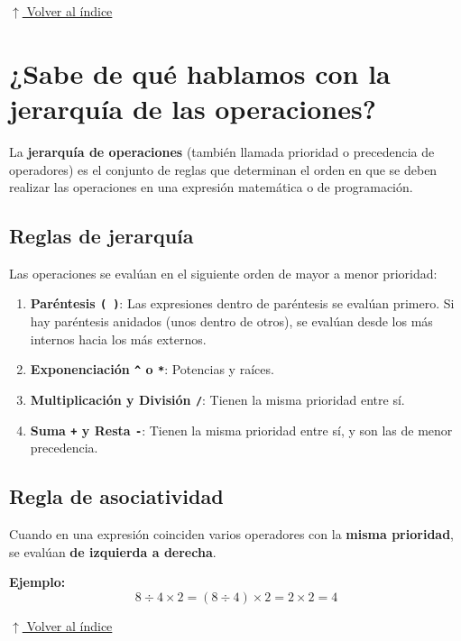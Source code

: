 \documentclass[12pt]{article}
\newcommand{\codigo}[1]{\texttt{\small #1}}
\newcommand{\volverindice}{%
    \vspace{1em}%
    \begin{flushright}%
        \hyperlink{indice}{\small $\uparrow$ Volver al índice}%
    \end{flushright}%
}
\begin{document}
\volverindice
\newpage


\section{¿Sabe de qué hablamos con la jerarquía de las operaciones?}

La \textbf{jerarquía de operaciones} (también llamada prioridad o precedencia de operadores) es el conjunto de reglas que determinan el orden en que se deben realizar las operaciones en una expresión matemática o de programación.

\subsection{Reglas de jerarquía}

Las operaciones se evalúan en el siguiente orden de mayor a menor prioridad:

\begin{enumerate}
    \item \textbf{Paréntesis \codigo{( )}}: Las expresiones dentro de paréntesis se evalúan primero. Si hay paréntesis anidados (unos dentro de otros), se evalúan desde los más internos hacia los más externos.
    
    \item \textbf{Exponenciación \codigo{\^{}} o \codigo{**}}: Potencias y raíces.
    
    \item \textbf{Multiplicación \codigo{*} y División \codigo{/}}: Tienen la misma prioridad entre sí.
    
    \item \textbf{Suma \codigo{+} y Resta \codigo{-}}: Tienen la misma prioridad entre sí, y son las de menor precedencia.
\end{enumerate}

\subsection{Regla de asociatividad}

Cuando en una expresión coinciden varios operadores con la \textbf{misma prioridad}, se evalúan \textbf{de izquierda a derecha}.

\textbf{Ejemplo:}
\[
8 \div 4 \times 2 = (8 \div 4) \times 2 = 2 \times 2 = 4
\]

\volverindice
\newpage
\end{document}
